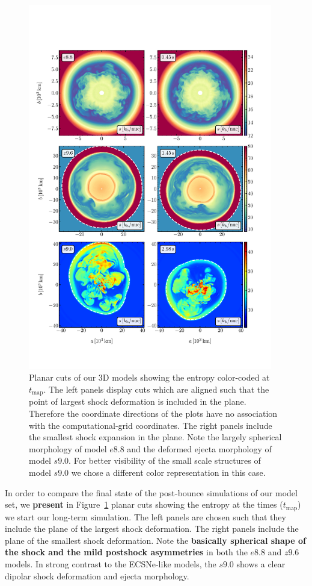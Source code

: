\documentclass[fleqn,usenatbib]{mnras}
\begin{document}
\begin{figure}
 \centering
 \includegraphics[width=0.95\textwidth,trim=0cm 1.8cm 0cm 3cm,clip]{pic/all_3d_sto_slices_time_0.pdf}
 \caption{Planar cuts of our 3D models showing the entropy color-coded at $t_{\mathrm{map}}$. The left panels display cuts which are aligned such that the point of largest shock deformation is included in the plane. Therefore the coordinate directions of the plots have no association with the computational-grid coordinates. The right panels include the smallest shock expansion in the plane. Note the largely spherical morphology of model $e8.8$ and the deformed ejecta morphology of model $s9.0$. For better visibility of the small scale structures of model $s9.0$ we chose a different color representation in this case.}
 \label{fig:slices first mapping}
\end{figure}
In order to compare the final state of the post-bounce simulations of our model set, we \textbf{present} in Figure~\ref{fig:slices first mapping} planar cuts showing the entropy at the times ($t_{\mathrm{map}}$) we start our long-term simulation. The left panels are chosen such that they include the plane of the largest shock deformation. The right panels include the plane of the smallest shock deformation.
Note the \textbf{basically spherical shape of the shock and the mild postshock asymmetries} in both the $e8.8$ and $z9.6$ models.
In strong contrast to the ECSNe-like models, the $s9.0$ shows a clear dipolar shock deformation and ejecta morphology. 
\end{document}
